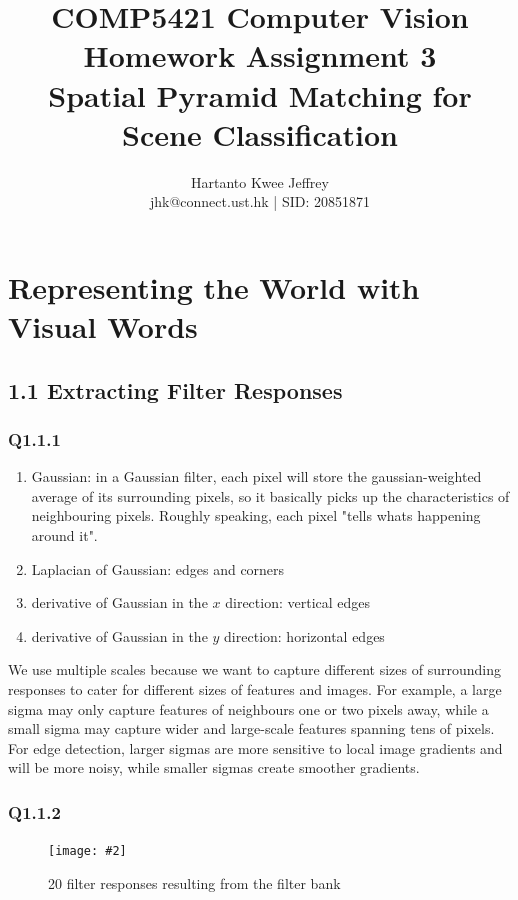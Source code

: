 \documentclass{article} %
\title{\large COMP5421 Computer Vision
\\ \huge Homework Assignment 3
\\ \huge Spatial Pyramid Matching for Scene Classification}
\author{Hartanto Kwee Jeffrey\\
    \normalsize jhk@connect.ust.hk | SID: 20851871} %
\date{}
\newcommand{\img}[3][0.3]{    
    \begin{figure}[h]
        \centering
        \texttt{[image: \#2]}
        \caption{#3}
    \end{figure}
}
\begin{document}
    \maketitle %
    
    \section[1]{Representing the World with Visual Words} %

    \subsection*{1.1 Extracting Filter Responses}
    \subsubsection*{Q1.1.1}

    \begin{enumerate}
        \item Gaussian: in a Gaussian filter, each pixel will store the gaussian-weighted average of its surrounding pixels, so it basically picks up the characteristics of neighbouring pixels. Roughly speaking, each pixel "tells whats happening around it".
        \item Laplacian of Gaussian: edges and corners
        \item derivative of Gaussian in the $x$ direction: vertical edges 
        \item derivative of Gaussian in the $y$ direction: horizontal edges
    \end{enumerate}
    
    We use multiple scales because we want to capture different sizes of surrounding responses to cater for different sizes of features and images. For example, a large sigma may only capture features of neighbours one or two pixels away, while a small sigma may capture wider and large-scale features spanning tens of pixels. For edge detection, larger sigmas are more sensitive to local image gradients and will be more noisy, while smaller sigmas create smoother gradients.

    \subsubsection*{Q1.1.2}
    \img{q1,1.png}{20 filter responses resulting from the filter bank}
\end{document}
